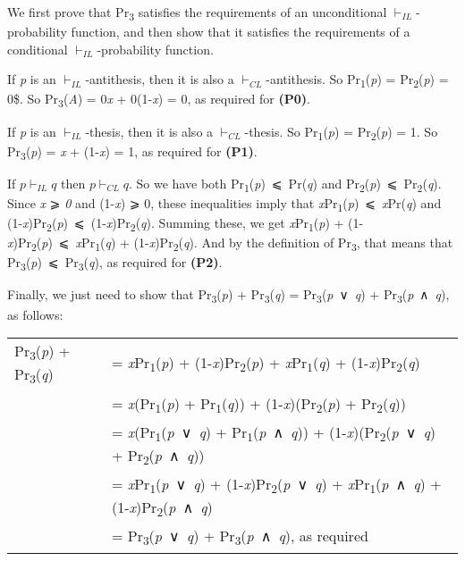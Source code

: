 \documentclass[
  11pt,
  letterpaper,
  DIV=11,
  numbers=noendperiod,
  twoside]{scrartcl}
\begin{document}
We first prove that Pr\textsubscript{3} satisfies the requirements of an
unconditional \(\vdash_{IL}\)-probability function, and then show that
it satisfies the requirements of a conditional
\(\vdash_{IL}\)-probability function.

If \emph{p} is an \(\vdash_{IL}\)-antithesis, then it is also a
\(\vdash_{CL}\)-antithesis. So Pr\textsubscript{1}(\emph{p}) =
Pr\textsubscript{2}(\emph{p}) = 0\$. So Pr\textsubscript{3}(\emph{A}) =
0\emph{x} + 0(1-\emph{x}) = 0, as required for \textbf{(P0)}.

If \emph{p} is an \(\vdash_{IL}\)-thesis, then it is also a
\(\vdash_{CL}\)-thesis. So Pr\textsubscript{1}(\emph{p}) =
Pr\textsubscript{2}(\emph{p}) = 1. So Pr\textsubscript{3}(\emph{p}) =
\emph{x} + (1-\emph{x}) = 1, as required for \textbf{(P1)}.

If \(p \vdash_{IL} q\) then \(p \vdash_{CL} q\). So we have both
Pr\textsubscript{1}(\emph{p})~⩽~Pr(\emph{q}) and
Pr\textsubscript{2}(\emph{p})~⩽~Pr\textsubscript{2}(\emph{q}). Since
\emph{x} ⩾ \emph{0} and (1-\emph{x}) ⩾ 0, these inequalities imply that
\emph{x}Pr\textsubscript{1}(\emph{p})~⩽~\emph{x}Pr(\emph{q}) and
(1-\emph{x})Pr\textsubscript{2}(\emph{p})~⩽~(1-\emph{x})Pr\textsubscript{2}(\emph{q}).
Summing these, we get \emph{x}Pr\textsubscript{1}(\emph{p}) +
(1-\emph{x})Pr\textsubscript{2}(\emph{p})~⩽~\emph{x}Pr\textsubscript{1}(\emph{q})
+ (1-\emph{x})Pr\textsubscript{2}(\emph{q}). And by the definition of
Pr\textsubscript{3}, that means that
Pr\textsubscript{3}(\emph{p})~⩽~Pr\textsubscript{3}(\emph{q}), as
required for \textbf{(P2)}.

Finally, we just need to show that Pr\textsubscript{3}(\emph{p}) +
Pr\textsubscript{3}(\emph{q}) = Pr\textsubscript{3}(\emph{p}~∨~\emph{q})
+ Pr\textsubscript{3}(\emph{p}~∧~\emph{q}), as follows:

\begin{longtable}[]{@{}
  >{\raggedleft\arraybackslash}p{}
  >{\raggedright\arraybackslash}p{}@{}}
\toprule\noalign{}
\endhead
\bottomrule\noalign{}
\endlastfoot
Pr\textsubscript{3}(\emph{p}) + Pr\textsubscript{3}(\emph{q}) & =
\emph{x}Pr\textsubscript{1}(\emph{p}) +
(1-\emph{x})Pr\textsubscript{2}(\emph{p}) +
\emph{x}Pr\textsubscript{1}(\emph{q}) +
(1-\emph{x})Pr\textsubscript{2}(\emph{q}) \\
& = \emph{x}(Pr\textsubscript{1}(\emph{p}) +
Pr\textsubscript{1}(\emph{q})) +
(1-\emph{x})(Pr\textsubscript{2}(\emph{p}) +
Pr\textsubscript{2}(\emph{q})) \\
& = \emph{x}(Pr\textsubscript{1}(\emph{p}~∨~\emph{q}) +
Pr\textsubscript{1}(\emph{p}~∧~\emph{q})) +
(1-\emph{x})(Pr\textsubscript{2}(\emph{p}~∨~\emph{q}) +
Pr\textsubscript{2}(\emph{p}~∧~\emph{q})) \\
& = \emph{x}Pr\textsubscript{1}(\emph{p}~∨~\emph{q}) +
(1-\emph{x})Pr\textsubscript{2}(\emph{p}~∨~\emph{q}) +
\emph{x}Pr\textsubscript{1}(\emph{p}~∧~\emph{q}) +
(1-\emph{x})Pr\textsubscript{2}(\emph{p}~∧~\emph{q}) \\
& = Pr\textsubscript{3}(\emph{p}~∨~\emph{q}) +
Pr\textsubscript{3}(\emph{p}~∧~\emph{q}), as required \\
\end{longtable}
\end{document}

